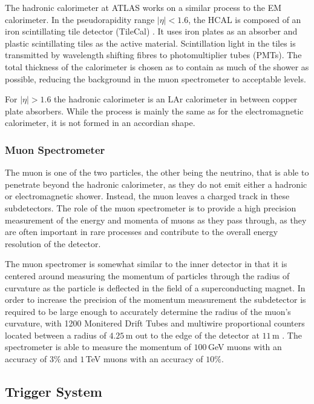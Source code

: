 \documentclass{article}
\begin{document}
The hadronic calorimeter at ATLAS works on a similar process to the EM calorimeter. In the pseudorapidity range $|\eta|<1.6$, the HCAL is composed of an iron scintillating tile detector (TileCal) \cite{ATLASCalorimetry}. It uses iron plates as an absorber and plastic scintillating tiles as the active material. Scintillation light in the tiles is transmitted by wavelength shifting fibres to photomultiplier tubes (PMTs). The total thickness of the calorimeter is chosen as to contain as much of the shower as possible, reducing the background in the muon spectrometer to acceptable levels. 

For $|\eta|>1.6$ the hadronic calorimeter is an LAr calorimeter in between copper plate absorbers. While the process is mainly the same as for the electromagnetic calorimeter, it is not formed in an accordian shape.

\subsubsection{Muon Spectrometer}
\label{sec:ATLAS_DetectorSchematics_Muon}

The muon is one of the two particles, the other being the neutrino, that is able to penetrate beyond the hadronic calorimeter, as they do not emit either a hadronic or electromagnetic shower. Instead, the muon leaves a charged track in these subdetectors. The role of the muon spectrometer is to provide a high precision measurement of the energy and momenta of muons as they pass through, as they are often important in rare processes and contribute to the overall energy resolution of the detector.

The muon spectromer is somewhat similar to the inner detector in that it is centered around measuring the momentum of particles through the radius of curvature as the particle is deflected in the field of a superconducting magnet. In order to increase the precision of the momentum measurement the subdetector is required to be large enough to accurately determine the radius of the muon's curvature, with 1200 Monitered Drift Tubes and multiwire proportional counters located between a radius of $4.25\,$m out to the edge of the detector at $11\,$m \cite{ATLASMuonSpectrometer}. The spectrometer is able to measure the momentum of $100\,$GeV muons with an accuracy of $3\%$ and $1\,$TeV muons with an accuracy of $10\%$.

\subsection{Trigger System}
\label{sec:ATLAS_Trigger}
\end{document}
